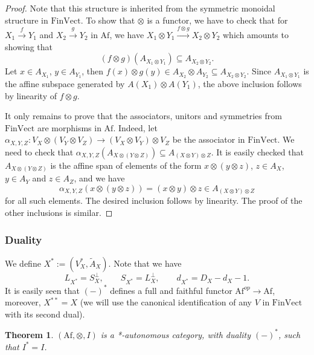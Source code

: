 \documentclass[12pt]{article}
\newtheorem{theorem}{Theorem}
\theoremstyle{definition}
\theoremstyle{remark}
\def \Af{\mathrm{Af}}
\def \FV{\mathrm{FinVect}}
\begin{document}
\begin{proof} Note that this structure is inherited from the symmetric monoidal structure
in $\FV$. To show that $\otimes$ is a functor, we have to check that for $X_1\xrightarrow{f} Y_1$ and $X_2\xrightarrow{g} Y_2$ in
$\Af$, we have $X_1\otimes Y_1\xrightarrow{f\otimes g} X_2\otimes Y_2$ which amounts to
showing that 
\[
(f\otimes g)(A_{X_1\otimes Y_1})\subseteq A_{X_2\otimes Y_2}.
\]
Let $x\in A_{X_1}$, $y\in A_{Y_1}$, then $f(x)\otimes g(y)\in A_{X_2}\otimes
A_{Y_2}\subseteq A_{X_2\otimes Y_2}$. Since  $A_{X_1\otimes Y_1}$ is the affine subspace
generated by $A(X_1)\otimes A(Y_1)$, the above inclusion follows by linearity of $f\otimes
g$. 

It only remains to prove that the associators, unitors and symmetries from
$\FV$ are morphisms in $\Af$. Indeed, let $\alpha_{X,Y,Z}:V_X\otimes (V_Y\otimes V_Z)\to
(V_X\otimes V_Y)\otimes V_Z$ be the associator in $\FV$. We need to check that
$\alpha_{X,Y,Z}(A_{X\otimes(Y\otimes Z)})\subseteq A_{(X\otimes Y)\otimes Z}$. It is easily
checked that $A_{X\otimes(Y\otimes Z)}$ is the affine span of elements of the form
$x\otimes (y\otimes z)$, $z\in A_X$, $y\in A_Y$ and $z\in A_Z$, and we have
\[
\alpha_{X,Y,Z}(x\otimes (y\otimes z))=(x\otimes y)\otimes z\in A_{(X\otimes Y)\otimes Z}
\]
for all such elements. The desired inclusion follows by linearity.
The proof of the other inclusions is similar.

\end{proof}



\subsubsection{Duality}

We define $X^*:=(V_X^*,\tilde A_X)$. Note that we have
\[
L_{X^*}=S_X^\perp,\qquad S_{X^*}=L_X^\perp,\qquad d_{X^*}=D_X-d_X-1.
\]
It is easily seen  that $(-)^*$ defines a full and faithful functor $\Af^{op}\to \Af$,
moreover, $X^{**}=X$ (we will use  the canonical identification of  any $V$ in $\FV$ with its second dual). 


\begin{theorem} $(\Af,\otimes,I)$ is a *-autonomous category, with duality $(-)^*$, such
that $I^*=I$.

\end{theorem}
\end{document}
